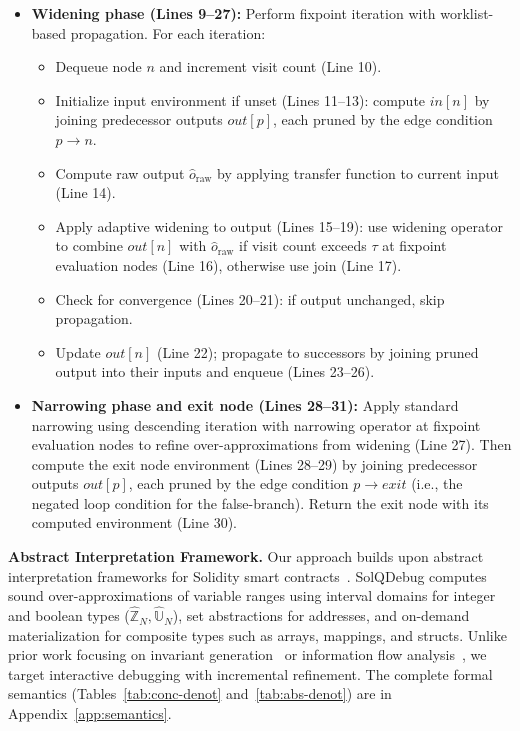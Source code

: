 \documentclass[pdflatex,sn-basic]{sn-jnl}%
\theoremstyle{thmstyleone}%
\theoremstyle{thmstyletwo}%
\theoremstyle{thmstylethree}%
\begin{document}
\begin{itemize}
  \item \textbf{Widening phase (Lines 9--27):} Perform fixpoint iteration with worklist-based propagation. For each iteration:
  \begin{itemize}
    \item Dequeue node $n$ and increment visit count (Line 10).
    \item Initialize input environment if unset (Lines 11--13): compute $in[n]$ by joining predecessor outputs $out[p]$, each pruned by the edge condition $p \to n$.
    \item Compute raw output $\hat{o}_{\text{raw}}$ by applying transfer function to current input (Line 14).
    \item Apply adaptive widening to output (Lines 15--19): use widening operator to combine $out[n]$ with $\hat{o}_{\text{raw}}$ if visit count exceeds $\tau$ at fixpoint evaluation nodes (Line 16), otherwise use join (Line 17).
    \item Check for convergence (Lines 20--21): if output unchanged, skip propagation.
    \item Update $out[n]$ (Line 22); propagate to successors by joining pruned output into their inputs and enqueue (Lines 23--26).
  \end{itemize}

  \item \textbf{Narrowing phase and exit node (Lines 28--31):} Apply standard narrowing using descending iteration with narrowing operator at fixpoint evaluation nodes to refine over-approximations from widening (Line 27). Then compute the exit node environment (Lines 28--29) by joining predecessor outputs $out[p]$, each pruned by the edge condition $p \to exit$ (i.e., the negated loop condition for the false-branch). Return the exit node with its computed environment (Line 30).
\end{itemize}

\smallskip
\noindent\textbf{Abstract Interpretation Framework.}
Our approach builds upon abstract interpretation frameworks for Solidity smart contracts~\citep{flow,DBM}.
SolQDebug computes sound over-approximations of variable ranges using interval domains
for integer and boolean types ($\widehat{\mathbb{Z}}_N, \widehat{\mathbb{U}}_N$), set abstractions
for addresses, and on-demand materialization for composite types such as arrays, mappings, and structs.
Unlike prior work focusing on invariant generation~\citep{DBM} or information flow analysis~\citep{flow}, we target interactive debugging with incremental refinement.
The complete formal semantics (Tables~\ref{tab:conc-denot} and~\ref{tab:abs-denot}) are in Appendix~\ref{app:semantics}.
\end{document}

